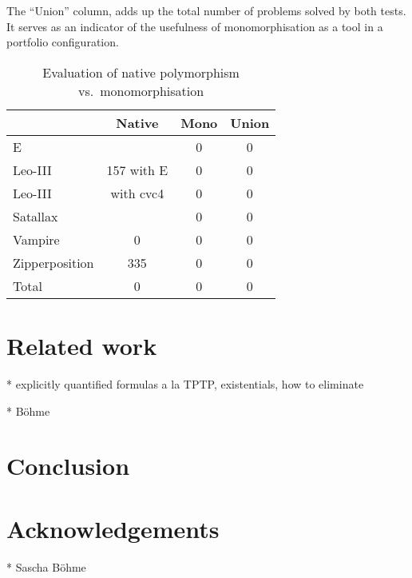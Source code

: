 \documentclass[]{ceurart}
\begin{document}
The ``Union'' column, adds up the total number of problems solved by both tests. It serves as an indicator of the usefulness of monomorphisation as a tool in a portfolio configuration.

\begin{table}[ht]
\caption{Evaluation of native polymorphism vs.\ monomorphisation}
\centering\begin{tabular}{@{}lccc@{}}
   \toprule
   & Native & Mono & Union \\
   \midrule
   E  &   & 0 & 0 \\
   Leo-III & 157 with E & 0 & 0 \\ %
   Leo-III &  with cvc4 & 0 & 0 \\ %
   Satallax &  & 0 & 0 \\
   Vampire & 0 & 0 & 0 \\ %
   Zipperposition & 335 & 0 & 0 \\[1.5\jot]
   Total & 0 & 0 & 0 \\
   \bottomrule
\end{tabular}
\end{table}


\break

\section{Related work}
\label{sec:related-work}

  * explicitly quantified formulas a la TPTP, existentials, how to eliminate

  * Böhme

\section{Conclusion}
\label{sec:conclusion}



\section*{Acknowledgements}

* Sascha Böhme


\end{document}
